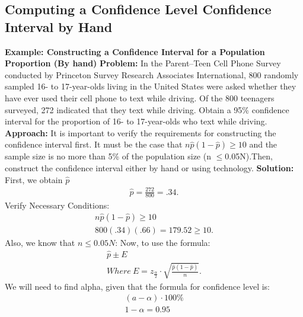 \documentclass{report}
\begin{document}
        \subsection*{Computing a Confidence Level Confidence Interval by Hand}
        \bigbreak \noindent 
        \begin{mdframed}
        \textbf{Example: Constructing a Confidence Interval for a Population Proportion (By hand)}
        \bigbreak \noindent 
        \textbf{Problem:}
        In the Parent–Teen Cell Phone Survey conducted by Princeton Survey Research Associates International, 800 randomly sampled 16- to 17-year-olds living in the United States were asked whether they have ever used their cell phone to text while driving. Of the 800 teenagers surveyed, 272 indicated that they text while driving. Obtain a 95\% confidence interval for the proportion of 16- to 17-year-olds who text while driving.
        \bigbreak \noindent 
        \textbf{Approach:}
        It is important to verify the requirements for constructing the confidence interval first. It must be the case that $n\hat{p}(1 −\hat{p}) \geq 10$ and the sample size is no more than 5\% of the population size (n $ \leq $0.05N).Then, construct the confidence interval either by hand or using technology.
        \bigbreak \noindent 
        \textbf{Solution:}
        \bigbreak \noindent 
        First, we obtain $\hat{p} $
        \begin{align*}
            \hat{p} = \frac{272}{800} = .34
        .\end{align*}
        \bigbreak \noindent 
        Verify Necessary Conditions:
        \begin{align*}
           n\hat{p}(1-\hat{p})  \geq 10 \\
            800(.34)(.66) = 179.52 \geq 10
        .\end{align*}
        \bigbreak \noindent 
        Also, we know that $n \leq0.05N $:
        \bigbreak \noindent 
        Now, to use the formula:
        \begin{align*}
            \hat{p} \pm E \\
        Where\ E = z_{\frac{\alpha}{2}} \cdot \sqrt{\frac{\hat{p}(1-\hat{p})}{n}}
        .\end{align*}
        We will need to find alpha, given that the formula for confidence level is:
        \begin{align*}
            (a-\alpha) \cdot 100\% \\
            1- \alpha = 0.95 \\

\end{align*}
\end{mdframed}
\end{document}
